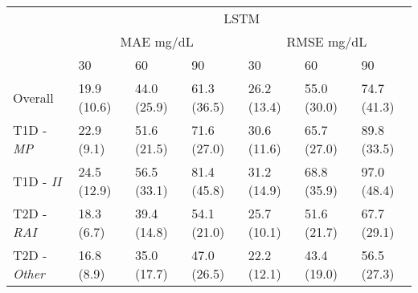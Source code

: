\begin{table}[b!]
\begin{tabular}{lllllll}
			& \multicolumn{6}{c}{LSTM}                                              \\ \cline{2-7}
			\multicolumn{1}{l|}{}                           & \multicolumn{3}{c|}{MAE mg/dL}          & \multicolumn{3}{c|}{RMSE mg/dL}         \\ \cline{2-7}
			\multicolumn{1}{l|}{}                           & 30 & 60 & \multicolumn{1}{l|}{90} & 30 & 60 & \multicolumn{1}{l|}{90} \\ \hline
			\multicolumn{1}{l|}{Overall}                & 19.9 (10.6) & 44.0 (25.9) & \multicolumn{1}{l|}{61.3 (36.5)} & 26.2 (13.4) & 55.0 (30.0) & \multicolumn{1}{l|}{74.7 (41.3)} \\
			\multicolumn{1}{l|}{T1D -{\sl  MP}}   & 22.9 (9.1) & 51.6 (21.5) & \multicolumn{1}{l|}{71.6 (27.0)} & 30.6 (11.6) & 65.7 (27.0) & \multicolumn{1}{l|}{89.8 (33.5)} \\
			\multicolumn{1}{l|}{T1D - {\sl II}}    & 24.5 (12.9) & 56.5 (33.1) & \multicolumn{1}{l|}{81.4 (45.8)} & 31.2 (14.9) & 68.8 (35.9) & \multicolumn{1}{l|}{97.0 (48.4)} \\
			\multicolumn{1}{l|}{T2D - {\sl RAI}} & 18.3 (6.7) & 39.4 (14.8) & \multicolumn{1}{l|}{54.1 (21.0)} & 25.7 (10.1) & 51.6 (21.7) & \multicolumn{1}{l|}{67.7 (29.1)} \\
			\multicolumn{1}{l|}{T2D - {\sl Other}}      & 16.8 (8.9) & 35.0 (17.7) & \multicolumn{1}{l|}{47.0 (26.5)} & 22.2 (12.1) & 43.4 (19.0) & \multicolumn{1}{l|}{56.5 (27.3)} \\ 
			
			\hline
			
		\end{tabular}
\end{table}
